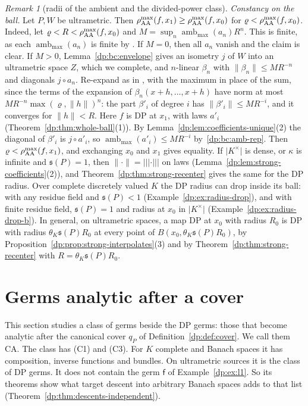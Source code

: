 \documentclass[11pt]{amsart}
\theoremstyle{definition}
\theoremstyle{remark}
\newtheorem{remark}[theorem]{Remark}
\numberwithin{equation}{section}
\newcommand{\abs}[1]{\lvert #1\rvert}
\newcommand{\norm}[1]{\lVert #1\rVert}
\theoremstyle{plain}
\theoremstyle{definition}
\theoremstyle{plain}
\begin{document}
\begin{remark}[radii of the ambient and the divided-power class]
\emph{Constancy on the ball.} Let $P,W$ be ultrametric. Then $\rho^{\max}_{\rm AA}(f,x_1)\ge\rho^{\max}_{\rm AA}(f,x_0)$ for $\varrho<\rho^{\max}_{\rm AA}(f,x_0)$. Indeed, let $\varrho<R<\rho^{\max}_{\rm AA}(f,x_0)$ and $M=\sup_n\operatorname{amb}_{\max}(a_n)R^n$. This is finite, as each $\operatorname{amb}_{\max}(a_n)$ is finite by \cite[Theorem~14.39(1), (14.9)]{I}. If $M=0$, then all $a_n$ vanish and the claim is clear. If $M>0$, Lemma~\ref{dp:bc:envelope} gives an isometry $j$ of $W$ into an ultrametric space $Z$, which we complete, and $n$\nobreakdash-linear $\beta_n$ with $\norm{\beta_n}\le MR^{-n}$ and diagonals $j\circ a_n$. Re-expand as in \cite[Proposition~14.12(2)]{I}, with the maximum in place of the sum, since the terms of the expansion of $\beta_n(x+h,\dots,x+h)$ have norm at most $MR^{-n}\max(\varrho,\norm h)^n$: the part $\beta'_i$ of degree $i$ has $\norm{\beta'_i}\le MR^{-i}$, and it converges for $\norm h<R$. Here $f$ is DP at $x_1$, with laws $a'_i$ (Theorem~\ref{dp:thm:whole-ball}(1)). By Lemma~\ref{dp:lem:coefficients-unique}(2) the diagonal of $\beta'_i$ is $j\circ a'_i$, so $\operatorname{amb}_{\max}(a'_i)\le MR^{-i}$ by~\eqref{dp:bc:amb-rep}. Then $\varrho<\rho^{\max}_{\rm AA}(f,x_1)$, and exchanging $x_0$ and $x_1$ gives equality. If $\abs{K^\times}$ is dense, or $\kappa$ is infinite and $\mathfrak s(P)=1$, then $\norm\cdot=\lvert\!\lvert\!\lvert \cdot\rvert\!\rvert\!\rvert$ on laws (Lemma~\ref{dp:lem:strong-coefficients}(2)), and Theorem~\ref{dp:thm:strong-recenter} gives the same for the DP radius. Over complete discretely valued $K$ the DP radius can drop inside its ball: with any residue field and $\mathfrak s(P)<1$ (Example~\ref{dp:ex:radius-drop}), and with finite residue field, $\mathfrak s(P)=1$ and radius at $x_0$ in $\abs{K^\times}$ (Example~\ref{dp:ex:radius-drop-b}). In general, on ultrametric spaces, a map DP at $x_0$ with radius $R_0$ is DP with radius $\theta_K\mathfrak s(P)R_0$ at every point of $B(x_0,\theta_K\mathfrak s(P)R_0)$, by Proposition~\ref{dp:prop:strong-interpolates}(3) and by Theorem~\ref{dp:thm:strong-recenter} with $R=\theta_K\mathfrak s(P)R_0$.
\end{remark}
\section{Germs analytic after a cover}\label{dp:sec:cover}

This section studies a class of germs beside the DP germs: those that become analytic after the canonical cover $q_P$ of Definition~\ref{dp:def:cover}. We call them CA. The class has (C1) and (C3). For $K$ complete and Banach spaces it has composition, inverse functions and bundles. On ultrametric sources it is the class of DP germs. It does not contain the germ $\mathsf f$ of Example~\ref{dp:ex:l1}. So its theorems show what target descent into arbitrary Banach spaces adds to that list (Theorem~\ref{dp:thm:descents-independent}).
\end{document}
